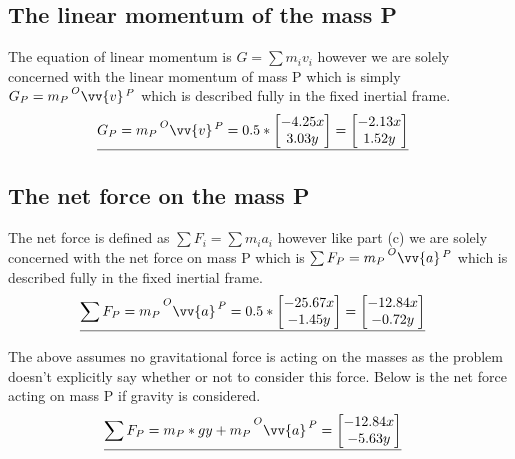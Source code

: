 \documentclass{article}
\begin{document}
\subsection{The linear momentum of the mass P}

The equation of linear momentum is $G = \sum m_i v_i$ however we are solely concerned with the linear momentum of mass P which is simply $G_P = m_P \prescript{O}{}{\vv{v}}^{\, P}$ which is described fully in the fixed inertial frame.
\begin{align*}
    & \underline{G_P = m_P \prescript{O}{}{\vv{v}}^{\, P} = 0.5 * \begin{bmatrix} -4.25x \\ 3.03y \end{bmatrix} = \begin{bmatrix} -2.13x \\ 1.52y \end{bmatrix}}
\end{align*}

\subsection{The net force on the mass P}

The net force is defined as $\sum F_i = \sum m_i a_i$ however like part (c) we are solely concerned with the net force on mass P which is $\sum F_P = m_P \prescript{O}{}{\vv{a}}^{\, P}$ which is described fully in the fixed inertial frame.
\begin{align*}
    & \underline{\sum F_P = m_P \prescript{O}{}{\vv{a}^{\, P}} = 0.5 * \begin{bmatrix} -25.67x \\ -1.45y \end{bmatrix} = \begin{bmatrix} -12.84x \\ -0.72y \end{bmatrix}}
\end{align*}

The above assumes no gravitational force is acting on the masses as the problem doesn't explicitly say whether or not to consider this force. Below is the net force acting on mass P if gravity is considered.
\begin{align*}
    & \underline{\sum F_P = m_P * g y + m_P \prescript{O}{}{\vv{a}^{\, P}} = \begin{bmatrix} -12.84x \\ -5.63y \end{bmatrix}}
\end{align*}
\end{document}

